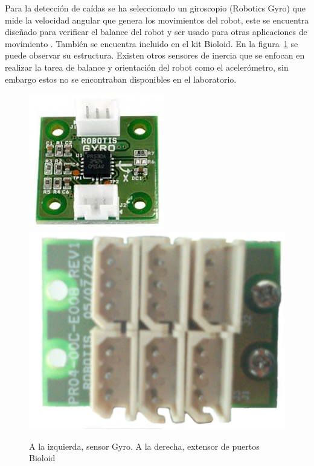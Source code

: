 
Para la detecci\'on de ca\'idas se ha seleccionado un giroscopio (Robotics Gyro) que mide la velocidad angular que genera los movimientos del robot, este se encuentra diseñado para verificar el balance del robot y ser usado para otras aplicaciones de movimiento \cite{gyro}. También se encuentra incluido en el kit Bioloid. En la figura~\ref{fig:gyroYextensor} se puede observar su estructura. Existen otros sensores de inercia que se enfocan en realizar la tarea de balance y orientaci\'on del robot como el aceler\'ometro, sin embargo estos no se encontraban disponibles en el laboratorio.

\begin{figure}[hbtp]
\centering
\includegraphics[scale=0.35]{imagenes/gyro.jpg}
\includegraphics[scale=0.08]{imagenes/extensor.jpg}
\caption{A la izquierda, sensor Gyro. A la derecha, extensor de puertos Bioloid}
\label{fig:gyroYextensor}
\end{figure}

